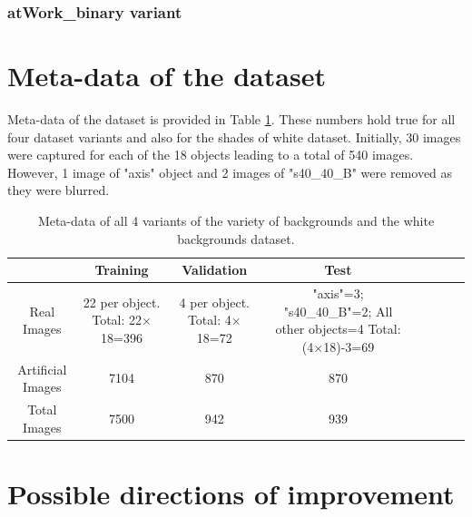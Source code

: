 	\subsubsection{atWork\_binary variant}
	

\newpage
\section{Meta-data of the dataset}

Meta-data of the dataset is provided in Table \ref{Table:meta}. These numbers hold true for all four dataset variants and also for the shades of white dataset. Initially, 30 images were captured for each of the 18 objects leading to a total of 540 images. However, 1 image of "axis" object and 2 images of "s40\_40\_B" were removed as they were blurred.

\begin{table}
	\centering
	\begin{tabular}{|c|c|c|c|c|c|c|c|}
	\hline 
    & Training & Validation & Test \\ 
	\hline 
	Real Images & \makecell{22 per object.\\ Total: 22$\times$18=396} & \makecell{4 per object.\\ Total: 4$\times$18=72} & 				\makecell{"axis"=3; \\"s40\_40\_B"=2; \\All other objects=4\\ Total: (4$\times$18)-3=69} \\ 
	\hline 
	Artificial Images & 7104 & 870 & 870 \\ 
	\hline 
	Total Images & 7500 & 942 & 939 \\ 
	\hline 
	\end{tabular}
	\caption{Meta-data of all 4 variants of the variety of backgrounds and the white backgrounds dataset.} 
	\label{Table:meta}
\end{table}

\section{Possible directions of improvement}


